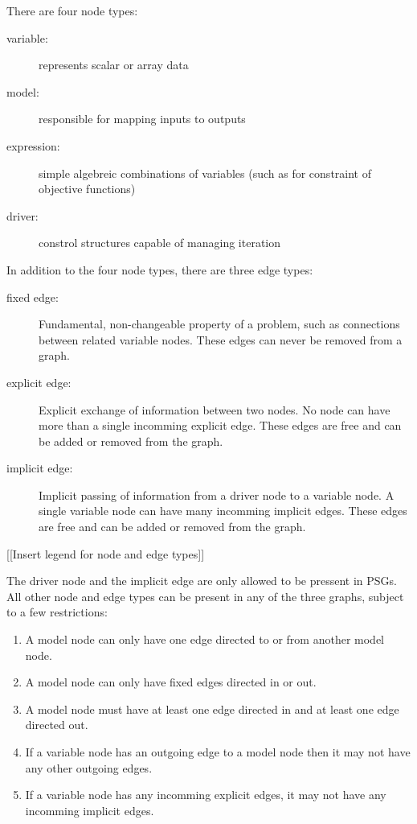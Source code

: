 There are four node types:  
\begin{description}
\item[variable: ] represents scalar or array data
\item[model:] responsible for mapping inputs to outputs
\item[expression:] simple algebreic combinations of variables (such as for 
  constraint of objective functions)
\item[driver:] constrol structures capable of managing iteration
\end{description}

In addition to the four node types, there are three edge types: 

\begin{description}
\item[fixed edge:] Fundamental, non-changeable property of a problem, such as 
  connections between related variable nodes. These 
edges can never be removed from a graph. 
\item[explicit edge:] Explicit exchange of information between two nodes. No node 
  can have more than a single incomming explicit edge. These edges are free and
  can be added or removed from the graph. 
\item [implicit edge:] Implicit passing of information from a driver node to a 
  variable node. A single variable node can have many incomming implicit edges. These edges are 
  free and can be added or removed from the graph. 
\end{description}

[[Insert legend for node and edge types]]

The driver node and the implicit edge are only allowed to be pressent in PSGs. All 
other node and edge types can be present in any of the three graphs, subject to a 
few restrictions: 
\begin{enumerate}
\item A model node can only have one edge directed to or from another model node.
\item A model node can only have fixed edges directed in or out.
\item A model node must have at least one edge directed in and at least one edge 
  directed out.
\item If a variable node has an outgoing edge to a model node then it may not have 
  any other outgoing edges.
\item If a variable node has any incomming explicit edges, it may not have any 
  incomming implicit edges. 
\end{enumerate}

